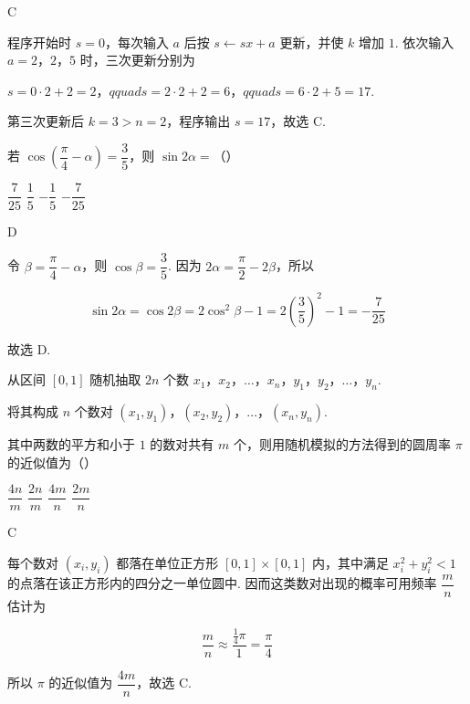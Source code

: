 \begin{answer}
C
\end{answer}

\begin{solution}
程序开始时 \(s=0\)，每次输入 \(a\) 后按 \(s\leftarrow sx+a\) 更新，并使 \(k\) 增加 \(1\). 依次输入 \(a=2\)，\(2\)，\(5\) 时，三次更新分别为

\(s=0\cdot2+2=2\)，\(qquad s=2\cdot2+2=6\)，\(qquad s=6\cdot2+5=17\).

第三次更新后 \(k=3>n=2\)，程序输出 \(s=17\)，故选 C.
\end{solution}

\begin{problem}
若 \(\cos\!\left(\dfrac{\pi}{4}-\alpha\right)=\dfrac35\)，则 \(\sin2\alpha=\)（\quad）

\choices
    {\(\dfrac{7}{25}\)}
    {\(\dfrac15\)}
    {\(-\dfrac15\)}
    {\(-\dfrac{7}{25}\)}
\end{problem}

\begin{answer}
D
\end{answer}

\begin{solution}
令 \(\beta=\dfrac\pi4-\alpha\)，则 \(\cos\beta=\dfrac35\). 因为 \(2\alpha=\dfrac\pi2-2\beta\)，所以

\[
\sin2\alpha=\cos2\beta=2\cos^2\beta-1=2\left(\frac35\right)^2-1=-\frac7{25}
\]

故选 D.
\end{solution}

\begin{problem}
从区间 \([0,1]\) 随机抽取 \(2n\) 个数 \(x_1\)，\(x_2\)，\(\dots\)，\(x_n\)，\(y_1\)，\(y_2\)，\(\dots\)，\(y_n\).

将其构成 \(n\) 个数对 \((x_1,y_1)\)，\((x_2,y_2)\)，\(\dots\)，\((x_n,y_n)\).

其中两数的平方和小于 \(1\) 的数对共有 \(m\) 个，则用随机模拟的方法得到的圆周率 \(\pi\) 的近似值为（\quad）

\choices
    {\(\dfrac{4n}{m}\)}
    {\(\dfrac{2n}{m}\)}
    {\(\dfrac{4m}{n}\)}
    {\(\dfrac{2m}{n}\)}
\end{problem}

\begin{answer}
C
\end{answer}

\begin{solution}
每个数对 \((x_i,y_i)\) 都落在单位正方形 \([0,1]\times[0,1]\) 内，其中满足 \(x_i^2+y_i^2<1\) 的点落在该正方形内的四分之一单位圆中. 因而这类数对出现的概率可用频率 \(\dfrac mn\) 估计为

\[
\frac mn\approx\frac{\frac14\pi}{1}=\frac\pi4
\]

所以 \(\pi\) 的近似值为 \(\dfrac{4m}{n}\)，故选 C.
\end{solution}

